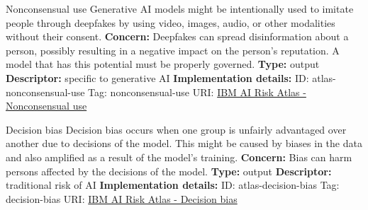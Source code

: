 \documentclass[a4paper,12pt]{article}
\begin{document}
\begin{definitionbox}{Nonconsensual use}
Generative AI models might be intentionally used to imitate people through deepfakes by using video, images, audio, or other modalities without their consent.\newline\newline
\textbf{Concern: }Deepfakes can spread disinformation about a person, possibly resulting in a negative impact on the person's reputation. A model that has this potential must be properly governed.\newline\newline
\textbf{Type: }output\newline
\textbf{Descriptor: }specific to generative AI \newline\newline
\textbf{Implementation details: } \newline
ID: atlas-nonconsensual-use \newline
Tag: nonconsensual-use \newline
URI:  \href{https://www.ibm.com/docs/en/watsonx/saas?topic=SSYOK8/wsj/ai-risk-atlas/nonconsensual-use.html}{IBM AI Risk Atlas - Nonconsensual use}\newline
\end{definitionbox}
\begin{definitionbox}{Decision bias}
Decision bias occurs when one group is unfairly advantaged over another due to decisions of the model. This might be caused by biases in the data and also amplified as a result of the model's training.\newline\newline
\textbf{Concern: }Bias can harm persons affected by the decisions of the model.\newline\newline
\textbf{Type: }output\newline
\textbf{Descriptor: }traditional risk of AI \newline\newline
\textbf{Implementation details: } \newline
ID: atlas-decision-bias \newline
Tag: decision-bias \newline
URI:  \href{https://www.ibm.com/docs/en/watsonx/saas?topic=SSYOK8/wsj/ai-risk-atlas/decision-bias.html}{IBM AI Risk Atlas - Decision bias}\newline
\end{definitionbox}
\end{document}
